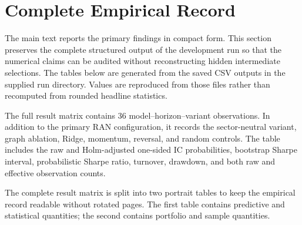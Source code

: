 \documentclass[10pt]{article}
\begin{document}
\section{Complete Empirical Record}

The main text reports the primary findings in compact form. This section preserves the complete structured output of the development run so that the numerical claims can be audited without reconstructing hidden intermediate selections. The tables below are generated from the saved CSV outputs in the supplied run directory. Values are reproduced from those files rather than recomputed from rounded headline statistics.

The full result matrix contains 36 model--horizon--variant observations. In addition to the primary RAN configuration, it records the sector-neutral variant, graph ablation, Ridge, momentum, reversal, and random controls. The table includes the raw and Holm-adjusted one-sided IC probabilities, bootstrap Sharpe interval, probabilistic Sharpe ratio, turnover, drawdown, and both raw and effective observation counts.

The complete result matrix is split into two portrait tables to keep the empirical record readable without rotated pages. The first table contains predictive and statistical quantities; the second contains portfolio and sample quantities.
\end{document}
